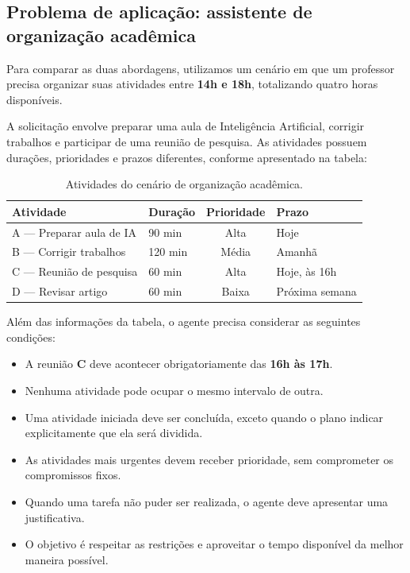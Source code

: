 \documentclass[12pt, a4paper]{article}
\begin{document}
\subsection{Problema de aplicação: assistente de organização acadêmica}

Para comparar as duas abordagens, utilizamos um cenário em que um professor precisa organizar suas atividades entre \textbf{14h e 18h}, totalizando quatro horas disponíveis.

A solicitação envolve preparar uma aula de Inteligência Artificial, corrigir trabalhos e participar de uma reunião de pesquisa. As atividades possuem durações, prioridades e prazos diferentes, conforme apresentado na tabela:

\begin{table}[H]
  \centering
  \small
  \caption{Atividades do cenário de organização acadêmica.}
  \label{tab:q11_atividades}
  \begin{tabular}{@{}llc l@{}}
    \toprule
    \textbf{Atividade} & \textbf{Duração} & \textbf{Prioridade} & \textbf{Prazo} \\
    \midrule
    A --- Preparar aula de IA & 90 min & Alta & Hoje \\
    B --- Corrigir trabalhos & 120 min & Média & Amanhã \\
    C --- Reunião de pesquisa & 60 min & Alta & Hoje, às 16h \\
    D --- Revisar artigo & 60 min & Baixa & Próxima semana \\
    \bottomrule
  \end{tabular}
\end{table}

Além das informações da tabela, o agente precisa considerar as seguintes condições:
\begin{itemize}[leftmargin=2em]
  \item A reunião \textbf{C} deve acontecer obrigatoriamente das \textbf{16h às 17h}.
  \item Nenhuma atividade pode ocupar o mesmo intervalo de outra.
  \item Uma atividade iniciada deve ser concluída, exceto quando o plano indicar explicitamente que ela será dividida.
  \item As atividades mais urgentes devem receber prioridade, sem comprometer os compromissos fixos.
  \item Quando uma tarefa não puder ser realizada, o agente deve apresentar uma justificativa.
  \item O objetivo é respeitar as restrições e aproveitar o tempo disponível da melhor maneira possível.
\end{itemize}
\end{document}
